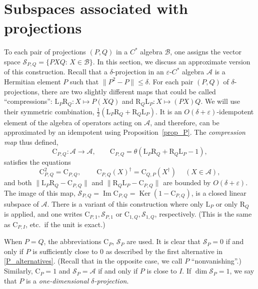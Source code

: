 \documentclass[12pt]{article}
\newcommand{\calA}{\mathcal{A}}
\newcommand{\calB}{\mathcal{B}}
\newcommand{\calS}{\mathcal{S}}
\DeclareMathOperator{\Ker}{Ker}
\DeclareMathOperator{\Img}{Im}
\newcommand{\La}{\mathrm{L}}
\newcommand{\Ra}{\mathrm{R}}
\newcommand{\Co}{\mathrm{C}}
\newcommand{\eps}{\varepsilon}
\renewcommand{\le}{\leqslant}
\newtheorem[definition]{Definition}[Theorem]{Definition}
\newtheorem[remark]{Example}[Theorem]{Example}
\newtheorem[remark]{Remark}[Theorem]{Remark}
\newtheorem[remark]{Question}[Theorem]{Open question}
\newtheorem*[definition]{definition}{Definition}
\newtheorem*[remark]{example}{Example}
\newtheorem*[remark]{remark}{Remark}
\newtheorem*[remark]{question}{Open question}
\numberwithin{equation}{section}
\begin{document}
\section{Subspaces associated with projections}\label{sec_subspaces}

To each pair of projections $(P,Q)$ in a $C^*$ algebra $\calB$, one assigns the vector space $\calS_{P,Q}=\{PXQ:\,X\in\calB\}$. In this section, we discuss an approximate version of this construction. Recall that a $\delta$-projection in an $\eps$-$C^*$ algebra $\calA$ is a Hermitian element $P$ such that $\|P^2-P\|\le\delta$. For each pair $(P,Q)$ of $\delta$-projections, there are two slightly different maps that could be called ``compressions'': $\La_P\Ra_Q\colon X\mapsto P(XQ)$ and $\Ra_Q\La_P\colon X\mapsto (PX)Q$. We will use their symmetric combination, $\frac{1}{2}(\La_P\Ra_Q+\Ra_Q\La_P)$. It is an $O(\delta+\eps)$-idempotent element of the algebra of operators acting on $\calA$, and therefore, can be approximated by an idempotent using Proposition~\ref{prop_P}. The \emph{compression map} thus defined,
\begin{equation}
\Co_{P,Q}\colon\calA\to\calA,\qquad
\Co_{P,Q}=\theta(\La_P\Ra_Q+\Ra_Q\La_P-1),
\end{equation}
satisfies the equations
\begin{equation}
\Co_{P,Q}^2=\Co_{P,Q},\qquad\:
\Co_{P,Q}(X)^\dag=\Co_{Q,P}(X^\dag)\quad\: (X\in\calA),
\end{equation}
and both $\|\La_P\Ra_Q-\Co_{P,Q}\|$ and $\|\Ra_Q\La_P-\Co_{P,Q}\|$ are bounded by $O(\delta+\eps)$. The image of this map, $\calS_{P,Q}=\Img\Co_{P,Q}=\Ker(1-\Co_{P,Q})$, is a closed linear subspace of $\calA$. There is a variant of this construction where only $\La_P$ or only $\Ra_Q$ is applied, and one writes $\Co_{P,1},\calS_{P,1}$ or $\Co_{1,Q},\calS_{1,Q}$, respectively. (This is the same as $\Co_{P,I}$, etc.\ if the unit is exact.)

When $P=Q$, the abbreviations $\Co_{P}$, $\calS_P$ are used. It is clear that $\calS_P=0$ if and only if $P$ is sufficiently close to $0$ as described by the first alternative in \eqref{P_alternatives}. (Recall that in the opposite case, we call $P$ ``nonvanishing''.) Similarly, $\Co_P=1$ and $\calS_P=\calA$ if and only if $P$ is close to $I$. If $\dim\calS_P=1$, we say that $P$ is a \emph{one-dimensional $\delta$-projection}.
\end{document}
